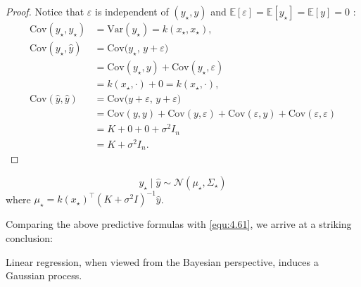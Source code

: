 \documentclass[../main]{subfiles}
\begin{document}
\begin{proof}
    Notice that $\varepsilon$ is independent of $(y_\star,y)$ and $\mathbb E[\varepsilon]=\mathbb E[y_\star]=\mathbb E[y]=0$ :
    \begin{align*}
        \mathrm{Cov}(y_\star, y_\star)
        &= \mathrm{Var}(y_\star)
         = k(x_\star,x_\star), \\[4pt]
        \mathrm{Cov}(y_\star, \hat y)
        &= \mathrm{Cov}\bigl(y_\star,\, y + \varepsilon\bigr) \\
        &= \mathrm{Cov}(y_\star,y) + \mathrm{Cov}(y_\star,\varepsilon) \\
        &= k(x_\star,\cdot) + 0
         = k(x_\star,\cdot), \\[4pt]
        \mathrm{Cov}(\hat y, \hat y)
        &= \mathrm{Cov}\bigl(y+\varepsilon,\,y+\varepsilon\bigr) \\
        &= \mathrm{Cov}(y,y)
           + \mathrm{Cov}(y,\varepsilon)
           + \mathrm{Cov}(\varepsilon,y)
           + \mathrm{Cov}(\varepsilon,\varepsilon) \\
        &= K + 0 + 0 + \sigma^2 I_n \\
        &= K + \sigma^2 I_n.
    \end{align*}    
\end{proof}
\begin{corollary}
    \begin{equation}
        y_\star\mid \hat y\sim\mathcal N(\mu_\star,\Sigma_\star)
    \end{equation}
    where $\mu_\star=k(x_\star)^\top(K+\sigma^2 I)^{-1}\hat y$.
\end{corollary}
Comparing the above predictive formulas with \eqref{equ:4.61}, we arrive at a
striking conclusion:
\begin{proposition}
    Linear regression, when viewed from the Bayesian perspective, induces a
    Gaussian process.
\end{proposition}
\end{document}
